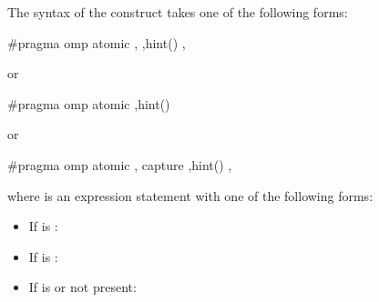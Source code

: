 \begin{ccppspecific}
The syntax of the  construct takes one of the following forms:

\begin{boxedcode}
\#pragma omp atomic \plc{[memory-order-clause[},\plc{]]}  
                 \plc{[[},\plc{]}hint()\plc{]} 
                 \plc{[[},\plc{]memory-order-clause]} 
\end{boxedcode}


or

\begin{boxedcode}
\#pragma omp atomic  \plc{[[},\plc{]}hint()\plc{]}  
\end{boxedcode}

or

\begin{boxedcode}
\#pragma omp atomic \plc{[memory-order-clause[},\plc{]]} capture 
                  \plc{[[},\plc{]}\plc{[}hint()\plc{]}
                  \plc{[[},\plc{]memory-order-clause]} 
\end{boxedcode}

where  is an expression statement with one of the following forms:

\begin{itemize}
\item If  is :\\

\item If  is :\\

\item If  is  or not present:\\
\\
\\
\\
\\
\\
\\


\end{itemize}
\end{ccppspecific}
